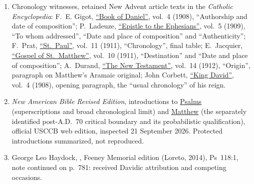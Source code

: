 \begin{enumerate}
\item Chronology witnesses, retained New Advent article texts in the \textit{Catholic Encyclopedia}: F.~E. Gigot, \href{https://www.newadvent.org/cathen/04621b.htm}{``Book of Daniel''}, vol.~4 (1908), ``Authorship and date of composition''; P.~Ladeuze, \href{https://www.newadvent.org/cathen/05485a.htm}{``Epistle to the Ephesians''}, vol.~5 (1909), ``To whom addressed'', ``Date and place of composition'' and ``Authenticity''; F.~Prat, \href{https://www.newadvent.org/cathen/11567b.htm}{``St.~Paul''}, vol.~11 (1911), ``Chronology'', final table; E.~Jacquier, \href{https://www.newadvent.org/cathen/10057a.htm}{``Gospel of St.~Matthew''}, vol.~10 (1911), ``Destination'' and ``Date and place of composition''; A.~Durand, \href{https://www.newadvent.org/cathen/14530a.htm}{``The New Testament''}, vol.~14 (1912), ``Origin'', paragraph on Matthew's Aramaic original; John Corbett, \href{https://www.newadvent.org/cathen/04642b.htm}{``King David''}, vol.~4 (1908), opening paragraph, the ``usual chronology'' of his reign.
\item \textit{New American Bible Revised Edition}, introductions to \href{https://bible.usccb.org/bible/psalms/0}{Psalms} (superscriptions and broad chronological limit) and \href{https://bible.usccb.org/bible/matthew/0}{Matthew} (the separately identified post-A.D.~70 critical boundary and its probabilistic qualification), official USCCB web edition, inspected 21 September 2026. Protected introductions summarized, not reproduced.
\item George Leo Haydock, , Feeney Memorial edition (Loreto, 2014), Ps~118:1, note continued on p.~781: received Davidic attribution and competing occasions.
\end{enumerate}
